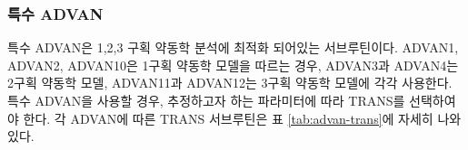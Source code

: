 \documentclass[
  10pt,
  krantz2,
  a4paper]{krantz}
\theoremstyle{definition}
\theoremstyle{definition}
\theoremstyle{definition}
\theoremstyle{remark}
\begin{document}
\hypertarget{uxd2b9uxc218-advan}{%
\subsubsection{\texorpdfstring{특수 ADVAN}{특수 ADVAN}}\label{uxd2b9uxc218-advan}}

특수 ADVAN은 1,2,3 구획 약동학 분석에 최적화 되어있는 서브루틴이다. ADVAN1, ADVAN2, ADVAN10은 1구획 약동학 모델을 따르는 경우, ADVAN3과 ADVAN4는 2구획 약동학 모델, ADVAN11과 ADVAN12는 3구획 약동학 모델에 각각 사용한다. 특수 ADVAN을 사용할 경우, 추정하고자 하는 파라미터에 따라 TRANS를 선택하여야 한다. 각 ADVAN에 따른 TRANS 서브루틴은 표 \ref{tab:advan-trans}에 자세히 나와있다.
\end{document}
